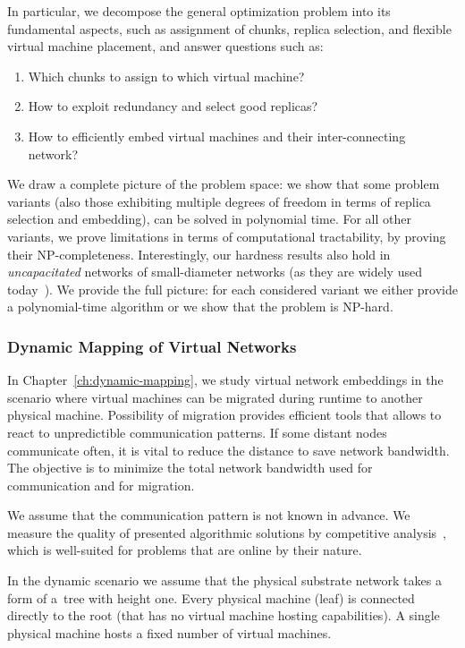 In particular, we decompose the general optimization problem into its fundamental aspects, such as
assignment of chunks, replica selection, and flexible virtual machine
placement, and answer questions such as:
\begin{enumerate}
\item Which chunks to assign to which virtual machine?

\item How to exploit redundancy and select good replicas?

\item How to efficiently embed virtual machines and their inter-connecting network?

\end{enumerate}

We draw a complete picture of the problem space: we show that
some problem variants (also those exhibiting multiple degrees of freedom in terms of
replica selection and embedding),
can be solved in polynomial time. For all other variants, we prove limitations in terms of
computational tractability, by proving their NP-completeness. Interestingly,
our hardness results also hold in \emph{uncapacitated}
networks of small-diameter networks (as they are
widely used today~\cite{fattree}).
We provide the full picture: for each considered variant we either provide a polynomial-time algorithm or we show that the problem is NP-hard.


\subsubsection{Dynamic Mapping of Virtual Networks}
\label{sec:contributions-dynamic-mapping}

In Chapter~\ref{ch:dynamic-mapping}, we study virtual network embeddings in the scenario where virtual machines can be migrated during runtime to another physical machine.
Possibility of migration provides efficient tools that allows to react to unpredictible communication patterns.
If some distant nodes communicate often, it is vital to reduce the distance to save network bandwidth.
The objective is to minimize the total network bandwidth used for communication and for migration.

We assume that the communication pattern is not known in advance.
We measure the quality of presented algorithmic solutions by competitive analysis~\cite{borodin-book}, which is well-suited for problems that are online by their nature.

In the dynamic scenario we assume that the physical substrate network takes a form of a~tree with height one.
Every physical machine (leaf) is connected directly to the root (that has no virtual machine hosting capabilities).
A single physical machine hosts a fixed number of virtual machines.

